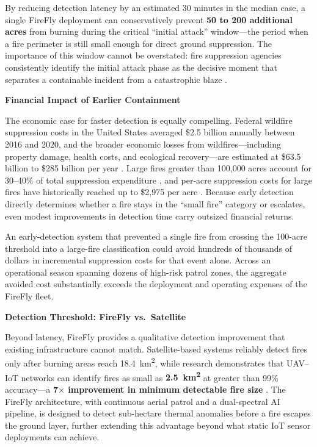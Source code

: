 \documentclass[journal, onecolumn]{IEEEtran}
\begin{document}
By reducing detection latency by an estimated 30 minutes in the median
case, a single FireFly deployment can conservatively prevent \textbf{50 to
200 additional acres} from burning during the critical ``initial attack''
window---the period when a fire perimeter is still small enough for direct
ground suppression. The importance of this window cannot be overstated: fire
suppression agencies consistently identify the initial attack phase as the
decisive moment that separates a containable incident from a catastrophic
blaze \cite{remote_sensing_signaling}.

\vspace{1em}

\textbf{Financial Impact of Earlier Containment}

The economic case for faster detection is equally compelling.
Federal wildfire suppression costs in the United States averaged
\$2.5 billion annually between 2016 and 2020, and the broader economic
losses from wildfires---including property damage, health costs, and
ecological recovery---are estimated at \$63.5 billion to \$285 billion
per year \cite{cbo_wildfires, arxiv_ai_wildfire}. Large fires greater
than 100,000 acres account for 30--40\% of total suppression
expenditure \cite{fuego_econ}, and per-acre suppression costs for
large fires have historically reached up to \$2,975 per acre \cite{usfa_cost}.
Because early detection directly determines whether a fire stays in the
``small fire'' category or escalates, even modest improvements in
detection time carry outsized financial returns.

An early-detection system that prevented a single fire from crossing the
100-acre threshold into a large-fire classification could avoid hundreds
of thousands of dollars in incremental suppression costs for that event
alone. Across an operational season spanning dozens of high-risk patrol
zones, the aggregate avoided cost substantially exceeds the deployment and
operating expenses of the FireFly fleet.

\vspace{1em}

\textbf{Detection Threshold: FireFly vs.\ Satellite}

Beyond latency, FireFly provides a qualitative detection improvement that
existing infrastructure cannot match. Satellite-based systems reliably
detect fires only after burning areas reach 18.4~km\textsuperscript{2},
while research demonstrates that UAV--IoT networks can identify fires as
small as \textbf{2.5~km\textsuperscript{2}} at greater than 99\% accuracy---a
\textbf{7$\times$ improvement in minimum detectable fire size}
\cite{ieee_uav_iot_detection}. The FireFly architecture, with continuous
aerial patrol and a dual-spectral AI pipeline, is designed to detect
sub-hectare thermal anomalies before a fire escapes the ground layer,
further extending this advantage beyond what static IoT sensor deployments
can achieve.
\end{document}
